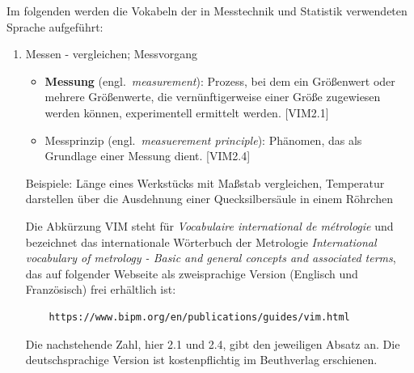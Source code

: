 \documentclass[a4paper,12pt,DIV=15]{scrartcl}
\begin{document}
Im folgenden werden die Vokabeln der in Messtechnik und Statistik verwendeten Sprache aufgeführt:
\begin{enumerate}
\item Messen - vergleichen; Messvorgang
	\begin{itemize}
	\item \textbf{Messung} (engl.\ \textsl{measurement}): Prozess, bei dem ein Größenwert oder mehrere Grö\-ßen\-werte, die
	vernünftigerweise einer Größe zugewiesen werden können, experimentell ermittelt werden. [VIM2.1]
	\item Messprinzip (engl.\ \textsl{measuerement principle}): Phänomen, das als Grundlage einer 
	Messung dient. [VIM2.4]
	\end{itemize}
	Beispiele: Länge eines Werkstücks mit Maßstab vergleichen, Temperatur darstellen über 
	die Ausdehnung einer Quecksilbersäule in einem Röhrchen

	Die Abkürzung VIM steht für \textsl{Vocabulaire international de m{\'e}trologie} 
	und bezeichnet das internationale Wörterbuch der Metrologie
	\textsl{International vocabulary of metrology - 
	Basic and general concepts and associated terms}, das auf folgender Webseite als zweisprachige
	Version (Englisch und Französisch) frei erhältlich ist:
	\begin{verbatim}
	https://www.bipm.org/en/publications/guides/vim.html
	\end{verbatim}
	Die nachstehende Zahl, hier 2.1 und 2.4, gibt den jeweiligen Absatz an. Die deutschsprachige
	Version ist kostenpflichtig im Beuthverlag erschienen.


\end{enumerate}
\end{document}
